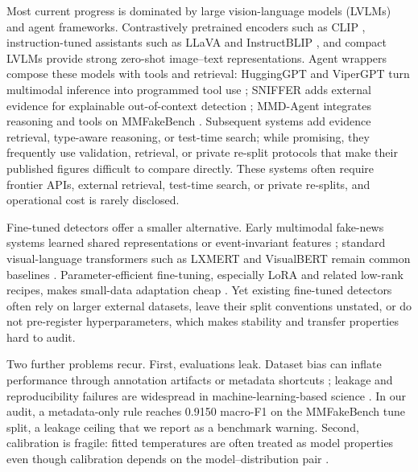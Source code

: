 \documentclass{article} %
\begin{document}
Most current progress is dominated by large vision-language models (LVLMs) and agent frameworks. Contrastively pretrained encoders such as CLIP \citep{Radford2021LearningTransferable}, instruction-tuned assistants such as LLaVA and InstructBLIP \citep{Liu2023VisualInstruction, Dai2023InstructblipTowards}, and compact LVLMs \citep{Zhu2024LlavaphiEfficient} provide strong zero-shot image--text representations. Agent wrappers compose these models with tools and retrieval: HuggingGPT and ViperGPT turn multimodal inference into programmed tool use \citep{Shen2023HugginggptSolving, Surs2023VipergptVisual}; SNIFFER adds external evidence for explainable out-of-context detection \citep{Qi2024SnifferMultimodal}; MMD-Agent integrates reasoning and tools on MMFakeBench \citep{Liu2024MmfakebenchMixedsource}. Subsequent systems add evidence retrieval, type-aware reasoning, or test-time search; while promising, they frequently use validation, retrieval, or private re-split protocols that make their published figures difficult to compare directly. These systems often require frontier APIs, external retrieval, test-time search, or private re-splits, and operational cost is rarely disclosed.

Fine-tuned detectors offer a smaller alternative. Early multimodal fake-news systems learned shared representations or event-invariant features \citep{Khattar2019MvaeMultimodal, Wang2018EannEvent, Singhal2019SpotfakeMultimodal}; standard visual-language transformers such as LXMERT and VisualBERT remain common baselines \citep{Tan2019LxmertLearning, Li2019VisualbertSimple}. Parameter-efficient fine-tuning, especially LoRA and related low-rank recipes, makes small-data adaptation cheap \citep{Hu2021LoraLowrank, Kalajdzievski2023RankStabilization, Shuttleworth2024LoraVs}. Yet existing fine-tuned detectors often rely on larger external datasets, leave their split conventions unstated, or do not pre-register hyperparameters, which makes stability and transfer properties hard to audit.

Two further problems recur. First, evaluations leak. Dataset bias can inflate performance through annotation artifacts or metadata shortcuts \citep{Gururangan2018AnnotationArtifacts, Gebru2018DatasheetsDatasets}; leakage and reproducibility failures are widespread in machine-learning-based science \citep{Kapoor2023LeakageReproducibility, Pineau2020ImprovingReproducibility, Kapoor2024ReformsConsensusbased}. In our audit, a metadata-only rule reaches 0.9150 macro-F1 on the MMFakeBench tune split, a leakage ceiling that we report as a benchmark warning. Second, calibration is fragile: fitted temperatures are often treated as model properties even though calibration depends on the model--distribution pair \citep{Guo2017CalibrationModern, Naeini2015ObtainingWell, Ovadia2019CanYou, Minderer2021RevisitingCalibration}.
\end{document}
